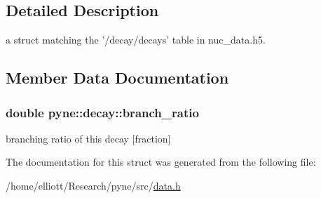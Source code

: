 \subsection{Detailed Description}
a struct matching the '/decay/decays' table in nuc\-\_\-data.\-h5. 

\subsection{Member Data Documentation}
\hypertarget{structpyne_1_1decay_a21a58630e6aac8aa5517fb9d1bafe5d6}{
\subsubsection[{branch\-\_\-ratio}]{\setlength{\rightskip}{0pt plus 5cm}double pyne\-::decay\-::branch\-\_\-ratio}}\label{structpyne_1_1decay_a21a58630e6aac8aa5517fb9d1bafe5d6}
branching ratio of this decay \mbox{[}fraction\mbox{]} 

The documentation for this struct was generated from the following file\-:\begin{DoxyCompactItemize}
\item 
/home/elliott/\-Research/pyne/src/\hyperlink{data_8h}{data.\-h}\end{DoxyCompactItemize}
